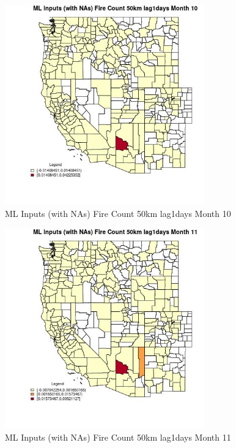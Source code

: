 \begin{figure} 
\centering  
\includegraphics[width=0.77\textwidth]{Code_Outputs/Report_ML_input_PM25_Step4_part_e_de_duplicated_aves_compiled_2019-05-21wNAs_CountyFire_Count_50km_lag1daysmedianMonth10.jpg} 
\caption{\label{fig:Report_ML_input_PM25_Step4_part_e_de_duplicated_aves_compiled_2019-05-21wNAsCountyFire_Count_50km_lag1daysmedianMonth10}ML Inputs (with NAs) Fire Count 50km lag1days Month 10} 
\end{figure} 
 

\clearpage 

\begin{figure} 
\centering  
\includegraphics[width=0.77\textwidth]{Code_Outputs/Report_ML_input_PM25_Step4_part_e_de_duplicated_aves_compiled_2019-05-21wNAs_CountyFire_Count_50km_lag1daysmedianMonth11.jpg} 
\caption{\label{fig:Report_ML_input_PM25_Step4_part_e_de_duplicated_aves_compiled_2019-05-21wNAsCountyFire_Count_50km_lag1daysmedianMonth11}ML Inputs (with NAs) Fire Count 50km lag1days Month 11} 
\end{figure} 
 

